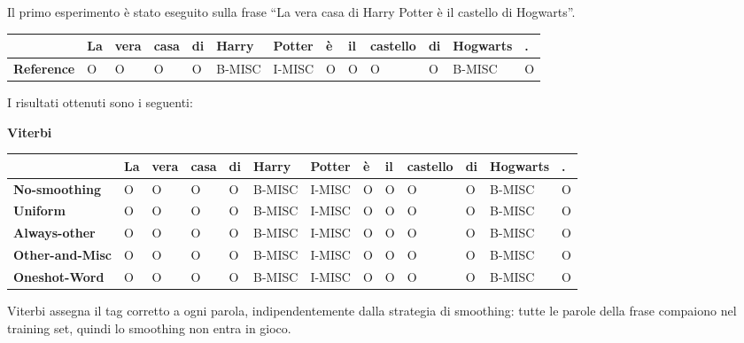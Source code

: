 \documentclass[a4paper,11pt,notitlepage]{report}
\begin{document}
Il primo esperimento è stato eseguito sulla frase ``La vera casa di Harry Potter è il castello di Hogwarts''.

\begin{center}
\scriptsize
\setlength{\tabcolsep}{3pt}
\begin{tabular}{|l|l|l|l|l|l|l|l|l|l|l|l|l|}
\hline
\textbf{} & \textbf{La} & \textbf{vera} & \textbf{casa} & \textbf{di} & \textbf{Harry} & \textbf{Potter} & \textbf{è} & \textbf{il} & \textbf{castello} & \textbf{di} & \textbf{Hogwarts} & \textbf{.} \\ \hline
\textbf{Reference} & O & O & O & O & B-MISC & I-MISC & O & O & O & O & B-MISC & O \\ \hline
\end{tabular}
\end{center}

I risultati ottenuti sono i seguenti:

\begin{center}\textbf{Viterbi}\end{center}
\begin{center}
\scriptsize
\setlength{\tabcolsep}{3pt}
\begin{tabular}{|l|l|l|l|l|l|l|l|l|l|l|l|l|}
\hline
\textbf{} & \textbf{La} & \textbf{vera} & \textbf{casa} & \textbf{di} & \textbf{Harry} & \textbf{Potter} & \textbf{è} & \textbf{il} & \textbf{castello} & \textbf{di} & \textbf{Hogwarts} & \textbf{.} \\ \hline
\textbf{No-smoothing} & O & O & O & O & B-MISC & I-MISC & O & O & O & O & B-MISC & O \\ \hline
\textbf{Uniform} & O & O & O & O & B-MISC & I-MISC & O & O & O & O & B-MISC & O \\ \hline
\textbf{Always-other} & O & O & O & O & B-MISC & I-MISC & O & O & O & O & B-MISC & O \\ \hline
\textbf{Other-and-Misc} & O & O & O & O & B-MISC & I-MISC & O & O & O & O & B-MISC & O \\ \hline
\textbf{Oneshot-Word} & O & O & O & O & B-MISC & I-MISC & O & O & O & O & B-MISC & O \\ \hline
\end{tabular}
\end{center}

Viterbi assegna il tag corretto a ogni parola, indipendentemente dalla strategia di smoothing: tutte le parole della frase compaiono nel training set, quindi lo smoothing non entra in gioco.
\end{document}
